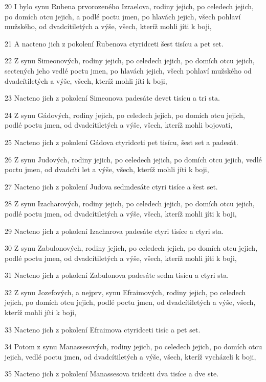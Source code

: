 \par 20 I bylo synu Rubena prvorozeného Izraelova, rodiny jejich, po celedech jejich, po domích otcu jejich, a podlé poctu jmen, po hlavách jejich, všech pohlaví mužského, od dvadcítiletých a výše, všech, kteríž mohli jíti k boji,
\par 21 A nacteno jich z pokolení Rubenova ctyridceti šest tisícu a pet set.
\par 22 Z synu Simeonových, rodiny jejich, po celedech jejich, po domích otcu jejich, sectených jeho vedlé poctu jmen, po hlavách jejich, všech pohlaví mužského od dvadcítiletých a výše, všech, kteríž mohli jíti k boji,
\par 23 Nacteno jich z pokolení Simeonova padesáte devet tisícu a tri sta.
\par 24 Z synu Gádových, rodiny jejich, po celedech jejich, po domích otcu jejich, podlé poctu jmen, od dvadcítiletých a výše, všech, kteríž mohli bojovati,
\par 25 Nacteno jich z pokolení Gádova ctyridceti pet tisícu, šest set a padesát.
\par 26 Z synu Judových, rodiny jejich, po celedech jejich, po domích otcu jejich, vedlé poctu jmen, od dvadcíti let a výše, všech, kteríž mohli jíti k boji,
\par 27 Nacteno jich z pokolení Judova sedmdesáte ctyri tisíce a šest set.
\par 28 Z synu Izacharových, rodiny jejich, po celedech jejich, po domích otcu jejich, podlé poctu jmen, od dvadcítiletých a výše, všech, kteríž mohli jíti k boji,
\par 29 Nacteno jich z pokolení Izacharova padesáte ctyri tisíce a ctyri sta.
\par 30 Z synu Zabulonových, rodiny jejich, po celedech jejich, po domích otcu jejich, podlé poctu jmen, od dvadcítiletých a výše, všech, kteríž mohli jíti k boji,
\par 31 Nacteno jich z pokolení Zabulonova padesáte sedm tisícu a ctyri sta.
\par 32 Z synu Jozefových, a nejprv, synu Efraimových, rodiny jejich, po celedech jejich, po domích otcu jejich, podlé poctu jmen, od dvadcítiletých a výše, všech, kteríž mohli jíti k boji,
\par 33 Nacteno jich z pokolení Efraimova ctyridceti tisíc a pet set.
\par 34 Potom z synu Manassesových, rodiny jejich, po celedech jejich, po domích otcu jejich, vedlé poctu jmen, od dvadcítiletých a výše, všech, kteríž vycházeli k boji,
\par 35 Nacteno jich z pokolení Manassesova tridceti dva tisíce a dve ste.
